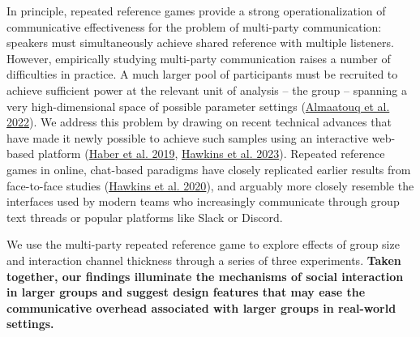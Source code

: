 \documentclass[
  english,
]{article}
\begin{document}
In principle, repeated reference games provide a strong operationalization of communicative effectiveness for the problem of multi-party communication: speakers must simultaneously achieve shared reference with multiple listeners.
However, empirically studying multi-party communication raises a number of difficulties in practice.
A much larger pool of participants must be recruited to achieve sufficient power at the relevant unit of analysis -- the group -- spanning a very high-dimensional space of possible parameter settings (\protect\hyperlink{ref-almaatouq2022}{Almaatouq et al. 2022}).
We address this problem by drawing on recent technical advances that have made it newly possible to achieve such samples using an interactive web-based platform (\protect\hyperlink{ref-haber2019}{Haber et al. 2019}, \protect\hyperlink{ref-hawkins2023partners}{Hawkins et al. 2023}).
Repeated reference games in online, chat-based paradigms have closely replicated earlier results from face-to-face studies (\protect\hyperlink{ref-hawkins2020}{Hawkins et al. 2020}), and arguably more closely resemble the interfaces used by modern teams who increasingly communicate through group text threads or popular platforms like Slack or Discord.

We use the multi-party repeated reference game to explore effects of group size and interaction channel thickness through a series of three experiments. \textbf{Taken together, our findings illuminate the mechanisms of social interaction in larger groups and suggest design features that may ease the communicative overhead associated with larger groups in real-world settings.}
\end{document}
